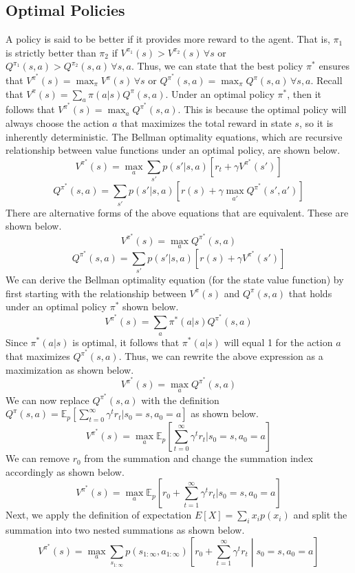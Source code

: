 \documentclass[11pt]{article}
\begin{document}
\subsection{Optimal Policies}
A policy is said to be better if it provides more reward to the agent. That is, $\pi_1$ is strictly better than $\pi_2$ if $V^{\pi_1}(s) > V^{\pi_2}(s)\, \forall s$ or $Q^{\pi_1}(s,a) > Q^{\pi_2}(s,a)\, \forall s,a$. Thus, we can state that the best policy $\pi^*$ ensures that $V^{\pi^*}(s) = \max_\pi V^\pi(s)\, \forall s$ or $Q^{\pi^*}(s,a) = \max_\pi Q^\pi(s,a)\, \forall s,a$. Recall that $V^\pi(s) = \sum_a\pi(a|s) Q^\pi(s, a)$. Under an optimal policy $\pi^*$, then it follows that $V^{\pi^*}(s) = \max_a Q^{\pi^*}(s, a)$. This is because the optimal policy will always choose the action $a$ that maximizes the total reward in state $s$, so it is inherently deterministic. The Bellman optimality equations, which are recursive relationship between value functions under an optimal policy, are shown below.
\[ V^{\pi^*}(s) = \max_a \sum_{s'} p(s'|s,a)[r_t + \gamma V^{\pi^*}(s')] \]
\[ Q^{\pi^*}(s,a) = \sum_{s'} p(s'|s,a)[r(s) + \gamma\max_{a'}Q^{\pi^*}(s',a')] \]
There are alternative forms of the above equations that are equivalent. These are shown below.
\[ V^{\pi^*}(s) = \max_a Q^{\pi^*}(s, a) \]
\[Q^{\pi^*}(s,a) = \sum_{s'} p(s'|s,a)[r(s) + \gamma V^{\pi^*}(s')] \]
We can derive the Bellman optimality equation (for the state value function) by first starting with the relationship between $V^\pi(s)$ and $Q^\pi(s,a)$ that holds under an optimal policy $\pi^*$ shown below.
\[ V^{\pi^*}(s) = \sum_a\pi^*(a|s) Q^{\pi^*}(s, a) \]
Since $\pi^*(a|s)$ is optimal, it follows that $\pi^*(a|s)$ will equal 1 for the action $a$ that maximizes $Q^{\pi^*}(s, a)$. Thus, we can rewrite the above expression as a maximization as shown below.
\[ V^{\pi^*}(s) = \max_a Q^{\pi^*}(s, a) \]
We can now replace $Q^{\pi^*}(s, a)$ with the definition $Q^\pi(s,a) = \mathds{E}_p \left[\sum_{t=0}^\infty \gamma^tr_t|s_0 = s, a_0 = a \right]$ as shown below.
\[ V^{\pi^*}(s) = \max_a \mathds{E}_p \left[\sum_{t=0}^\infty \gamma^tr_t|s_0 = s, a_0 = a \right] \]
We can remove $r_0$ from the summation and change the summation index accordingly as shown below.
\[ V^{\pi^*}(s) = \max_a \mathds{E}_p \left[r_0 + \sum_{t=1}^\infty \gamma^tr_t|s_0 = s, a_0 = a \right] \]
Next, we apply the definition of expectation $E[X] = \sum_i x_ip(x_i)$ and split the summation into two nested summations as shown below.
\[ V^{\pi^*}(s) = \max_a \sum_{s_{1:\infty}} p(s_{1:\infty},a_{1:\infty}) \left[r_0 + \sum_{t=1}^\infty \gamma^tr_t\middle|s_0 = s, a_0 = a \right] \]
\end{document}
